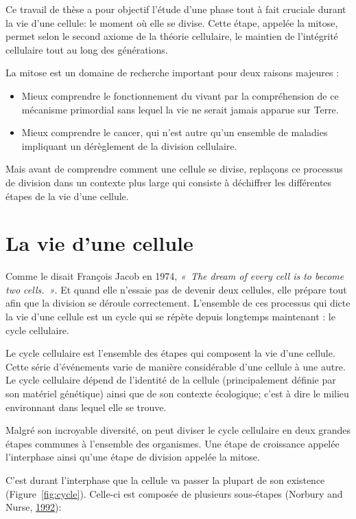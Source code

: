 \documentclass[12pt,a4paper,twoside,openright]{book}
\providecommand{\tightlist}{%
  \setlength{\itemsep}{0pt}\setlength{\parskip}{0pt}}
\begin{document}
Ce travail de thèse a pour objectif l'étude d'une phase tout à fait
cruciale durant la vie d'une cellule: le moment où elle se divise. Cette
étape, appelée la mitose, permet selon le second axiome de la théorie
cellulaire, le maintien de l'intégrité cellulaire tout au long des
générations.

La mitose est un domaine de recherche important pour deux raisons
majeures :

\begin{itemize}
\tightlist
\item
  Mieux comprendre le fonctionnement du vivant par la compréhension de
  ce mécanisme primordial sans lequel la vie ne serait jamais apparue
  sur Terre.
\item
  Mieux comprendre le cancer, qui n'est autre qu'un ensemble de maladies
  impliquant un dérèglement de la division cellulaire.
\end{itemize}

Mais avant de comprendre comment une cellule se divise, replaçons ce
processus de division dans un contexte plus large qui consiste à
déchiffrer les différentes étapes de la vie d'une cellule.

\section{La vie d'une cellule}\label{la-vie-dune-cellule}

Comme le disait François Jacob en 1974, \emph{«~The dream of every cell
is to become two cells.~»}. Et quand elle n'essaie pas de devenir deux
cellules, elle prépare tout afin que la division se déroule
correctement. L'ensemble de ces processus qui dicte la vie d'une cellule
est un cycle qui se répète depuis longtemps maintenant : le cycle
cellulaire.

Le cycle cellulaire est l'ensemble des étapes qui composent la vie d'une
cellule. Cette série d'événements varie de manière considérable d'une
cellule à une autre. Le cycle cellulaire dépend de l'identité de la
cellule (principalement définie par son matériel génétique) ainsi que de
son contexte écologique; c'est à dire le milieu environnant dans lequel
elle se trouve.

Malgré son incroyable diversité, on peut diviser le cycle cellulaire en
deux grandes étapes communes à l'ensemble des organismes. Une étape de
croissance appelée l'interphase ainsi qu'une étape de division appelée
la mitose.

C'est durant l'interphase que la cellule va passer la plupart de son
existence (Figure~\ref{fig:cycle}). Celle-ci est composée de plusieurs
sous-étapes (Norbury and Nurse,
\protect\hyperlink{ref-Norbury1992}{1992}):
\end{document}
